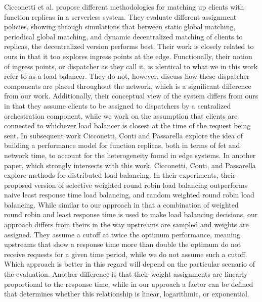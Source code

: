 Cicconetti et al. propose different methodologies for matching up clients with function replicas in a serverless system\cite{cicconettiDistributedComputingEnvironments2020}.
They evaluate different assignment policies, showing through simulations that between static global matching, periodical global matching, and dynamic decentralized matching of clients to replicas, the decentralized version performs best.
Their work is closely related to ours in that it too explores ingress points at the edge.
Functionally, their notion of ingress points, or dispatcher as they call it, is identical to what we in this work refer to as a load balancer.
They do not, however, discuss how these dispatcher components are placed throughout the network, which is a significant difference from our work.
Additionally, their conceptual view of the system differs from ours in that they assume clients to be assigned to dispatchers by a centralized orchestration component, while we work on the assumption that clients are connected to whichever load balancer is closest at the time of the request being sent.
In subsequent work Cicconetti, Conti and Passarella\cite{cicconettiArchitecturePerformanceEvaluation2020} explore the idea of building a performance model for function replicas, both in terms of \gls{fet} and network time, to account for the heterogeneity found in edge systems.
In another paper, which strongly intersects with this work, Cicconetti, Conti, and Passarella explore methods for distributed load balancing\cite{cicconettiDecentralizedFrameworkServerless2020}.
In their experiments, their proposed version of selective weighted round robin load balancing outperforms naive least response time load balancing, and random weighted round robin load balancing.
While similar to our approach in that a combination of weighted round robin and least response time is used to make load balancing decisions, our approach differs from theirs in the way upstreams are sampled and weights are assigned.
They assume a cutoff at twice the optimum performance, meaning upstreams that show a response time more than double the optimum do not receive requests for a given time period, while we do not assume such a cutoff\cite{cicconettiDecentralizedFrameworkServerless2020}.
Which approach is better in this regard will depend on the particular scenario of the evaluation.
Another difference is that their weight assignments are linearly proportional to the response time, while in our approach a factor can be defined that determines whether this relationship is linear, logarithmic, or exponential.


